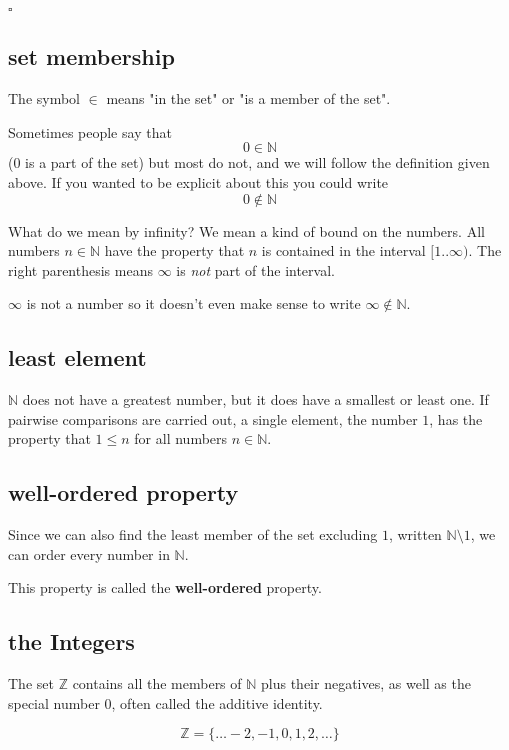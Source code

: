 \documentclass[11pt, oneside]{article}
\begin{document}
$\square$

\subsection*{set membership}

The symbol $\in$ means "in the set" or "is a member of the set".

Sometimes people say that
\[ 0 \in \mathbb{N} \]
(0 is a part of the set) but most do not, and we will follow the definition given above.  If you wanted to be explicit about this you could write
\[ 0 \notin \mathbb{N} \]

What do we mean by infinity?  We mean a kind of bound on the numbers.  All numbers $n \in \mathbb{N}$ have the property that $n$ is contained in the interval $[1..\infty)$.  The right parenthesis means $\infty$ is \emph{not} part of the interval.

$\infty$ is not a number so it doesn't even make sense to write $\infty \notin \mathbb{N}$.

\subsection*{least element}

$\mathbb{N}$ does not have a greatest number, but it does have a smallest or least one.  If pairwise comparisons are carried out, a single element, the number $1$, has the property that $1 \le n$ for all numbers $n \in \mathbb{N}$.

\subsection*{well-ordered property}

Since we can also find the least member of the set excluding $1$, written $\mathbb{N} \setminus 1$, we can order every number in $\mathbb{N}$.  

This property is called the \textbf{well-ordered} property.

\subsection*{the Integers}

The set $\mathbb{Z}$ contains all the members of $\mathbb{N}$ plus their negatives, as well as the special number $0$, often called the additive identity.

\[ \mathbb{Z} = \{ \dots -2, -1, 0, 1, 2, \dots \} \]
\end{document}
